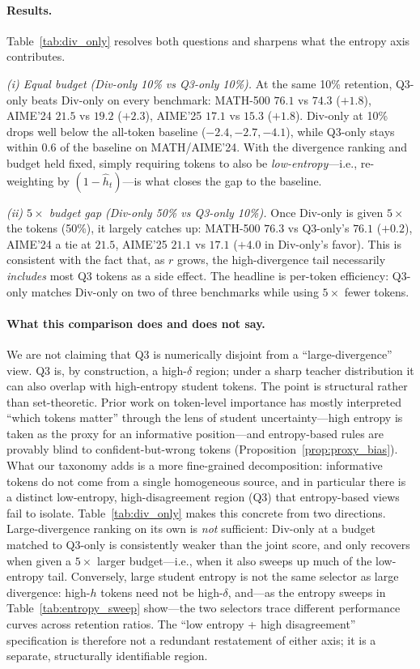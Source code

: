 \documentclass{article}
\begin{document}
\paragraph{Results.}
Table~\ref{tab:div_only} resolves both questions and sharpens what the entropy axis contributes.

\emph{(i) Equal budget (Div-only 10\% vs Q3-only 10\%).}
At the same 10\% retention, Q3-only beats Div-only on every benchmark: MATH-500 $76.1$ vs $74.3$ ($+1.8$), AIME'24 $21.5$ vs $19.2$ ($+2.3$), AIME'25 $17.1$ vs $15.3$ ($+1.8$).
Div-only at 10\% drops well below the all-token baseline ($-2.4, -2.7, -4.1$), while Q3-only stays within $0.6$ of the baseline on MATH/AIME'24.
With the divergence ranking and budget held fixed, simply requiring tokens to also be \emph{low-entropy}---i.e., re-weighting by $(1-\hat h_t)$---is what closes the gap to the baseline.

\emph{(ii) $5\times$ budget gap (Div-only 50\% vs Q3-only 10\%).}
Once Div-only is given $5\times$ the tokens (50\%), it largely catches up: MATH-500 $76.3$ vs Q3-only's $76.1$ ($+0.2$), AIME'24 a tie at $21.5$, AIME'25 $21.1$ vs $17.1$ ($+4.0$ in Div-only's favor).
This is consistent with the fact that, as $r$ grows, the high-divergence tail necessarily \emph{includes} most Q3 tokens as a side effect.
The headline is per-token efficiency: Q3-only matches Div-only on two of three benchmarks while using $5\times$ fewer tokens.

\paragraph{What this comparison does and does not say.}
We are not claiming that Q3 is numerically disjoint from a ``large-divergence'' view.
Q3 is, by construction, a high-$\delta$ region; under a sharp teacher distribution it can also overlap with high-entropy student tokens.
The point is structural rather than set-theoretic.
Prior work on token-level importance has mostly interpreted ``which tokens matter'' through the lens of student uncertainty---high entropy is taken as the proxy for an informative position---and entropy-based rules are provably blind to confident-but-wrong tokens (Proposition~\ref{prop:proxy_bias}).
What our taxonomy adds is a more fine-grained decomposition: informative tokens do not come from a single homogeneous source, and in particular there is a distinct low-entropy, high-disagreement region (Q3) that entropy-based views fail to isolate.
Table~\ref{tab:div_only} makes this concrete from two directions. Large-divergence ranking on its own is \emph{not} sufficient: Div-only at a budget matched to Q3-only is consistently weaker than the joint score, and only recovers when given a $5\times$ larger budget---i.e., when it also sweeps up much of the low-entropy tail.
Conversely, large student entropy is not the same selector as large divergence: high-$h$ tokens need not be high-$\delta$, and---as the entropy sweeps in Table~\ref{tab:entropy_sweep} show---the two selectors trace different performance curves across retention ratios.
The ``low entropy + high disagreement'' specification is therefore not a redundant restatement of either axis; it is a separate, structurally identifiable region.
\end{document}
